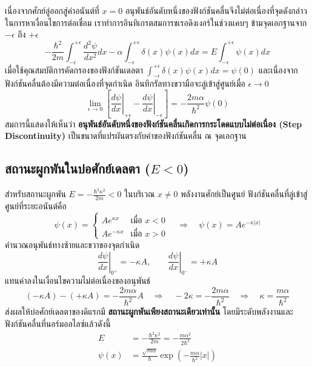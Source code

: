 เนื่องจากศักย์ลู่ออกสู่ค่าอนันต์ที่ $x = 0$ อนุพันธ์อันดับหนึ่งของฟังก์ชันคลื่นจึงไม่ต่อเนื่องที่จุดดังกล่าว ในการหาเงื่อนไขการต่อเชื่อม เราทำการอินทิเกรตสมการชเรอดิงเงอร์ในช่วงแคบๆ ข้ามจุดเอกฐานจาก $-\epsilon$ ถึง $+\epsilon$
\begin{equation}
-\frac{\hbar^2}{2m} \int_{-\epsilon}^{+\epsilon} \frac{d^2\psi}{dx^2} dx - \alpha \int_{-\epsilon}^{+\epsilon} \delta(x)\psi(x) dx = E \int_{-\epsilon}^{+\epsilon} \psi(x) dx
\end{equation}
เมื่อใช้คุณสมบัติการคัดกรองของฟังก์ชันเดลตา $\int_{-\epsilon}^{+\epsilon} \delta(x)\psi(x) dx = \psi(0)$ และเนื่องจากฟังก์ชันคลื่นต้องมีความต่อเนื่องที่จุดกำเนิด อินทิกรัลทางขวามือจะลู่เข้าสู่ศูนย์เมื่อ $\epsilon \to 0$
\begin{equation}
\lim_{\epsilon \to 0} \left[ \left.\frac{d\psi}{dx}\right|_{+\epsilon} - \left.\frac{d\psi}{dx}\right|_{-\epsilon} \right] = -\frac{2m\alpha}{\hbar^2}\psi(0)
\end{equation}
สมการนี้แสดงให้เห็นว่า \textbf{อนุพันธ์อันดับหนึ่งของฟังก์ชันคลื่นเกิดการกระโดดแบบไม่ต่อเนื่อง (Step Discontinuity)} เป็นขนาดที่แปรผันตรงกับค่าของฟังก์ชันคลื่น ณ จุดเอกฐาน

\subsection{สถานะผูกพันในบ่อศักย์เดลตา ($E < 0$)}
สำหรับสถานะผูกพัน $E = -\frac{\hbar^2\kappa^2}{2m} < 0$ ในบริเวณ $x \ne 0$ พลังงานศักย์เป็นศูนย์ ฟังก์ชันคลื่นที่ลู่เข้าสู่ศูนย์ที่ระยะอนันต์คือ
\begin{equation}
\psi(x) = \begin{cases}
A e^{\kappa x} & \text{เมื่อ } x < 0 \\
A e^{-\kappa x} & \text{เมื่อ } x > 0
\end{cases} \quad \Longrightarrow \quad \psi(x) = A e^{-\kappa |x|}
\end{equation}
คำนวณอนุพันธ์ทางซ้ายและขวาของจุดกำเนิด
\begin{equation}
\left.\frac{d\psi}{dx}\right|_{0^+} = -\kappa A, \qquad \left.\frac{d\psi}{dx}\right|_{0^-} = +\kappa A
\end{equation}
แทนค่าลงในเงื่อนไขความไม่ต่อเนื่องของอนุพันธ์
\begin{equation}
(-\kappa A) - (+\kappa A) = -\frac{2m\alpha}{\hbar^2} A \quad \Longrightarrow \quad -2\kappa = -\frac{2m\alpha}{\hbar^2} \quad \Longrightarrow \quad \kappa = \frac{m\alpha}{\hbar^2}
\end{equation}
ส่งผลให้บ่อศักย์เดลตาของดิแรกมี \textbf{สถานะผูกพันเพียงสถานะเดียวเท่านั้น} โดยมีระดับพลังงานและฟังก์ชันคลื่นที่นอร์มอลไลซ์แล้วดังนี้
\begin{align}
E &= -\frac{\hbar^2\kappa^2}{2m} = -\frac{m\alpha^2}{2\hbar^2} \\
\psi(x) &= \frac{\sqrt{m\alpha}}{\hbar} \exp\left(-\frac{m\alpha}{\hbar^2}|x|\right)
\end{align}

